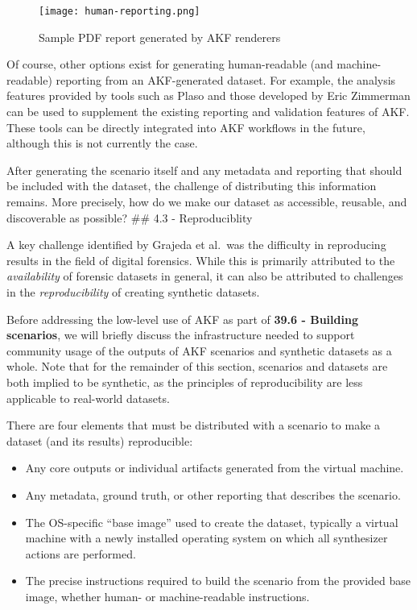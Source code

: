 \begin{figure*}[htbp]
\centering
\texttt{[image: human-reporting.png]}
\caption{Sample PDF report generated by AKF
renderers}\label{fig:scenario-report}
\end{figure*}

Of course, other options exist for generating human-readable (and
machine-readable) reporting from an AKF-generated dataset. For example,
the analysis features provided by tools such as Plaso
\cite{Log2timelinePlaso2025} and those developed by Eric Zimmerman
\cite{zimmermanEricZimmermansTools} can be used to supplement the
existing reporting and validation features of AKF. These tools can be
directly integrated into AKF workflows in the future, although this is
not currently the case.

After generating the scenario itself and any metadata and reporting that
should be included with the dataset, the challenge of distributing this
information remains. More precisely, how do we make our dataset as
accessible, reusable, and discoverable as possible? \#\# 4.3 -
Reproduciblity

A key challenge identified by Grajeda et al.~was the difficulty in
reproducing results in the field of digital forensics. While this is
primarily attributed to the \emph{availability} of forensic datasets in
general, it can also be attributed to challenges in the
\emph{reproducibility} of creating synthetic datasets.

Before addressing the low-level use of AKF as part of \textbf{39.6 -
Building scenarios}, we will briefly discuss the infrastructure needed
to support community usage of the outputs of AKF scenarios and synthetic
datasets as a whole. Note that for the remainder of this section,
scenarios and datasets are both implied to be synthetic, as the
principles of reproducibility are less applicable to real-world
datasets.

There are four elements that must be distributed with a scenario to make
a dataset (and its results) reproducible:

\begin{itemize}
\item
  Any core outputs or individual artifacts generated from the virtual
  machine.
\item
  Any metadata, ground truth, or other reporting that describes the
  scenario.
\item
  The OS-specific ``base image'' used to create the dataset, typically a
  virtual machine with a newly installed operating system on which all
  synthesizer actions are performed.
\item
  The precise instructions required to build the scenario from the
  provided base image, whether human- or machine-readable instructions.
\end{itemize}

